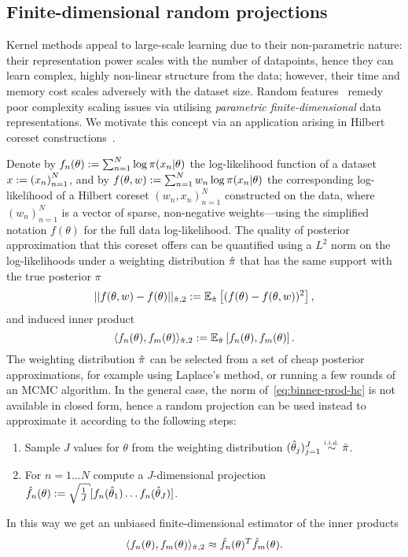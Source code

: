 \subsection{Finite-dimensional random projections}
\label{subsec:b-random-features}

Kernel methods appeal to large-scale learning due to their non-parametric nature: their representation power scales with the number of datapoints, hence they can learn complex, highly non-linear structure from the data; however, their time and memory cost scales adversely with the dataset size. Random features~\citep{rahimi08} remedy poor complexity scaling issues via utilising \emph{parametric finite-dimensional} data representations. We motivate this concept via an application arising in Hilbert coreset constructions~\citep{campbell19jmlr}.

Denote by $ f_n(\theta) := \sum_{n=1}^{N} \log\pi(x_n|\theta) $ the log-likelihood function of a dataset $x := {(x_n)}_{n=1}^{N}$, and by $ f(\theta,w) := \sum_{n=1}^{N} w_n\log\pi(x_n|\theta)$ the corresponding log-likelihood of a Hilbert coreset $(w_n, x_n)_{n=1}^{N}$ constructed on the data, where $(w_n)_{n=1}^{N}$ is a vector of sparse, non-negative weights---using the simplified notation $f(\theta)$ for the full data log-likelihood. The quality of posterior approximation that this coreset offers can be quantified using a $L^2$ norm on the log-likelihoods under a weighting distribution $\hat{\pi}$ that has the same support with the true posterior $\pi$ 
\[
||f(\theta, w) - f(\theta)||_{\hat{\pi},2} := \mathbb{E}_{\hat{\pi}} \left[ (f(\theta) - f(\theta, w))^2\right],
\]
and induced inner product
\[
\label{eq:binner-prod-hc}
\langle f_n(\theta), f_m(\theta) \rangle_{\hat{\pi}, 2} := \mathbb{E}_{\hat{\pi}}\left[f_n(\theta), f_m(\theta)\right].
\]
The weighting distribution $\hat{\pi}$ can be selected from a set of cheap posterior approximations, for example using Laplace's method, or running a few rounds of an MCMC algorithm. In the general case, the norm of~\cref{eq:binner-prod-hc} is not available in closed form, hence a random projection can be used instead to approximate it according to the following steps:
\begin{enumerate}
	\item Sample $J$ values for $\theta$ from the weighting distribution $(\htheta_j)_{j=1}^{J} \distiid \hpi$.
	\item For $n=1 \ldots N$ compute a $J$-dimensional projection $ \hf_n(\theta) \defined \sqrt{\frac{1}{J}}[f_n(\htheta_1) \ldots f_n(\htheta_J)]$.
\end{enumerate}
In this way we get an unbiased finite-dimensional estimator of the inner products
\[
\langle f_n(\theta), f_m(\theta) \rangle_{\hat{\pi}, 2}  \approx \hat{f}_n(\theta)^T \hat{f}_m(\theta).
\]


